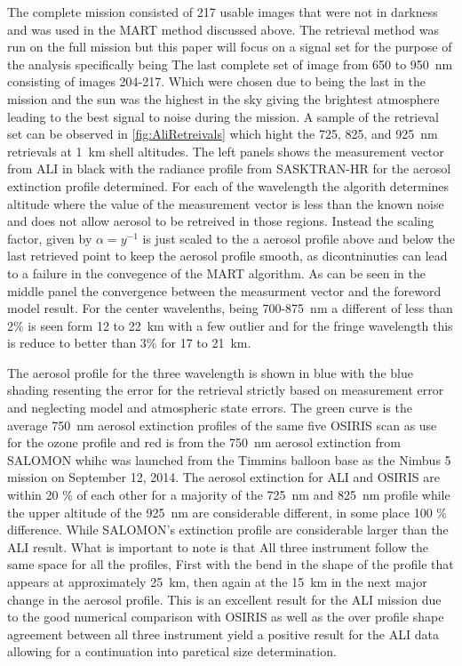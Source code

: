 \documentclass[12pt]{article}
\begin{document}
The complete mission consisted of 217 usable images that were not in darkness and was used in the MART method discussed above. The retrieval method was run on the full mission but this paper will focus on a signal set for the purpose of the analysis specifically being The last complete set of image from 650 to 950~nm consisting of images 204-217. Which were chosen due to being the last in the mission and the sun was the highest in the sky giving the brightest atmosphere leading to the best signal to noise during the mission. A sample of the retrieval set can be observed in \autoref{fig:AliRetreivals} which hight the 725, 825, and 925~nm retrievals at 1~km shell altitudes. The left panels shows the measurement vector from ALI in black with the radiance profile from SASKTRAN-HR for the aerosol extinction profile determined. For each of the wavelength the algorith determines altitude where the value of the measurement vector is less than the known noise and does not allow aerosol to be retreived in those regions. Instead the scaling factor, given by $\alpha = y^{-1}$ is just scaled to the a aerosol profile above and below the last retrieved point to keep the aerosol profile smooth, as dicontninuties can lead to a failure in the convegence of the MART algorithm. As can be seen in the middle panel the convergence between the measurment vector and the foreword model result. For the center wavelenths, being 700-875~nm a different of less than 2\% is seen form 12 to 22~km with a few outlier and for the fringe wavelength this is reduce to better than 3\% for 17 to 21~km.

The aerosol profile for the three wavelength is shown in blue with the blue shading resenting the error for the retrieval strictly based on measurement error and neglecting model and atmospheric state errors. The green curve is the average 750~nm aerosol extinction profiles of the same five OSIRIS scan as use for the ozone profile and red is from the 750~nm aerosol extinction from SALOMON \citep{Berthet2002} whihc was launched from the Timmins balloon base as the Nimbus 5 mission on September 12, 2014. The aerosol extinction for ALI and OSIRIS are within 20 \% of each other for a majority of the 725~nm and 825~nm profile while the upper altitude of the 925~nm are considerable different, in some place 100 \% difference. While SALOMON's extinction profile are considerable larger than the ALI result. What is important to note is that All three instrument follow the same space for all the profiles, First with the bend in the shape of the profile that appears at approximately 25~km, then again at the 15~km in the next major change in the aerosol profile. This is an excellent result for the ALI mission due to the good numerical comparison with OSIRIS as well as the over profile shape agreement between all three instrument yield a positive result for the ALI data allowing for a continuation into paretical size determination.
\end{document}

